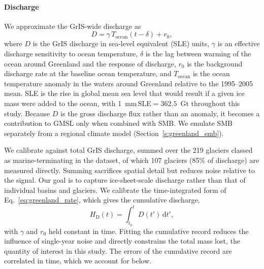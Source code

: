 \documentclass[draft,linenumbers]{agujournal2025}
\begin{document}
\paragraph{Discharge}
We approximate the GrIS-wide discharge as
\begin{equation}
	D = \gamma\,T_{\mathrm{ocean}}(t - \delta) + r_0,
	\label{eq:greenland_rate}
\end{equation}
where $D$ is the GrIS discharge in sea-level equivalent (SLE) units, $\gamma$ is an effective discharge sensitivity to ocean temperature, $\delta$ is the lag between warming of the ocean around Greenland and the response of discharge, $r_0$ is the background discharge rate at the baseline ocean temperature, and $T_{\mathrm{ocean}}$ is the ocean temperature anomaly in the waters around Greenland relative to the 1995--2005 mean. SLE is the rise in global mean sea level that would result if a given ice mass were added to the ocean, with 1~mm\,SLE${}= 362.5$~Gt throughout this study. Because $D$ is the gross discharge flux rather than an anomaly, it becomes a contribution to GMSL only when combined with SMB. We emulate SMB separately from a regional climate model (Section~\ref{s:greenland_smb}).

We calibrate against total GrIS discharge, summed over the 219 glaciers classed as marine-terminating in the \citet{Mouginot2019} dataset, of which 107 glaciers (85\% of discharge) are measured directly. Summing sacrifices spatial detail but reduces noise relative to the signal. Our goal is to capture ice-sheet-scale discharge rather than that of individual basins and glaciers. We calibrate the time-integrated form of Eq.~\ref{eq:greenland_rate}, which gives the cumulative discharge,
\begin{equation}
	H_{\mathrm{D}}(t) = \int_{t_0}^{t} D(t')\,\mathrm{d}t',
	\label{eq:greenland_dyn}
\end{equation}
with $\gamma$ and $r_0$ held constant in time. Fitting the cumulative record reduces the influence of single-year noise and directly constrains the total mass lost, the quantity of interest in this study. The errors of the cumulative record are correlated in time, which we account for below.
\end{document}

